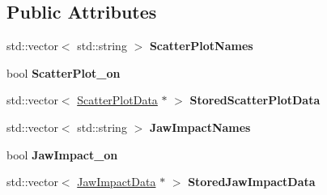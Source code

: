 \subsection*{Public Attributes}
\begin{DoxyCompactItemize}
\item 
\mbox{\label{classCollimation_1_1ScatteringModel_ab4db7776e1c4bb5eecde3c4ec18c89a7}} 
std\+::vector$<$ std\+::string $>$ {\bfseries Scatter\+Plot\+Names}
\item 
\mbox{\label{classCollimation_1_1ScatteringModel_a8b423f725f0050c150d23145d38b6742}} 
bool {\bfseries Scatter\+Plot\+\_\+on}
\item 
\mbox{\label{classCollimation_1_1ScatteringModel_a8a4b6e2c421450bc04ffb1dd123322e1}} 
std\+::vector$<$ \hyperlink{structCollimation_1_1ScatterPlotData}{Scatter\+Plot\+Data} $\ast$ $>$ {\bfseries Stored\+Scatter\+Plot\+Data}
\item 
\mbox{\label{classCollimation_1_1ScatteringModel_afab632770a66d1d034d0ff56ce4a32f9}} 
std\+::vector$<$ std\+::string $>$ {\bfseries Jaw\+Impact\+Names}
\item 
\mbox{\label{classCollimation_1_1ScatteringModel_a63f2a7a806ad87ba868def8f7d5627f7}} 
bool {\bfseries Jaw\+Impact\+\_\+on}
\item 
\mbox{\label{classCollimation_1_1ScatteringModel_a4d145269de4166e19e31e5ba1491277e}} 
std\+::vector$<$ \hyperlink{structCollimation_1_1JawImpactData}{Jaw\+Impact\+Data} $\ast$ $>$ {\bfseries Stored\+Jaw\+Impact\+Data}
\end{DoxyCompactItemize}
